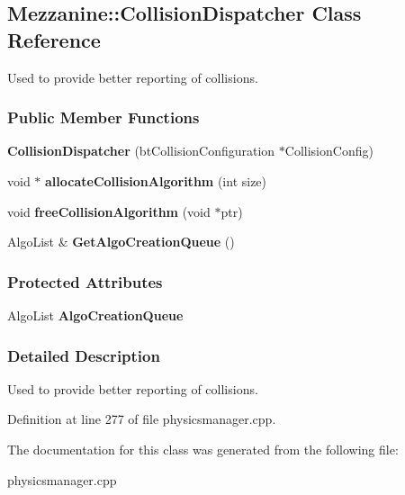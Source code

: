 \hypertarget{classMezzanine_1_1CollisionDispatcher}{
\subsection{Mezzanine::CollisionDispatcher Class Reference}
\label{classMezzanine_1_1CollisionDispatcher}
}


Used to provide better reporting of collisions.  


\subsubsection*{Public Member Functions}
\begin{DoxyCompactItemize}
\item 
\hypertarget{classMezzanine_1_1CollisionDispatcher_a9aa6ea6e6c0aaa308a5693062ccf6568}{
{\bfseries CollisionDispatcher} (btCollisionConfiguration $\ast$CollisionConfig)}
\label{classMezzanine_1_1CollisionDispatcher_a9aa6ea6e6c0aaa308a5693062ccf6568}

\item 
\hypertarget{classMezzanine_1_1CollisionDispatcher_ae384ed995cba028d6e7bd57098d2f67d}{
void $\ast$ {\bfseries allocateCollisionAlgorithm} (int size)}
\label{classMezzanine_1_1CollisionDispatcher_ae384ed995cba028d6e7bd57098d2f67d}

\item 
\hypertarget{classMezzanine_1_1CollisionDispatcher_a7f5296daba765a8b1c258239f519c021}{
void {\bfseries freeCollisionAlgorithm} (void $\ast$ptr)}
\label{classMezzanine_1_1CollisionDispatcher_a7f5296daba765a8b1c258239f519c021}

\item 
\hypertarget{classMezzanine_1_1CollisionDispatcher_accdd6570d86d41be9bc1672254d15ff9}{
AlgoList \& {\bfseries GetAlgoCreationQueue} ()}
\label{classMezzanine_1_1CollisionDispatcher_accdd6570d86d41be9bc1672254d15ff9}

\end{DoxyCompactItemize}
\subsubsection*{Protected Attributes}
\begin{DoxyCompactItemize}
\item 
\hypertarget{classMezzanine_1_1CollisionDispatcher_a124864848dcdbf42a92b45b3cca2137e}{
AlgoList {\bfseries AlgoCreationQueue}}
\label{classMezzanine_1_1CollisionDispatcher_a124864848dcdbf42a92b45b3cca2137e}

\end{DoxyCompactItemize}


\subsubsection{Detailed Description}
Used to provide better reporting of collisions. 

Definition at line 277 of file physicsmanager.cpp.



The documentation for this class was generated from the following file:\begin{DoxyCompactItemize}
\item 
physicsmanager.cpp\end{DoxyCompactItemize}
